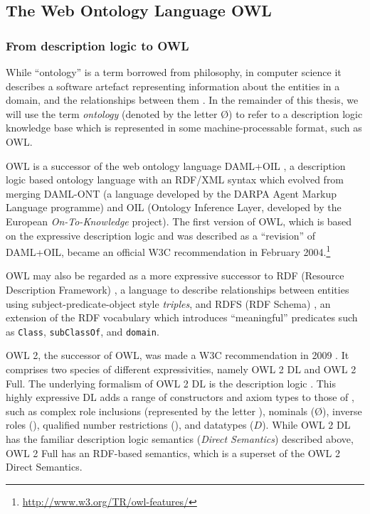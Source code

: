 \subsection{The Web Ontology Language OWL}


\subsubsection{From description logic to OWL}

While \enquote{ontology} is a term borrowed from philosophy, in computer science it describes a software artefact representing information about the entities in a domain, and the relationships between them \cite{gruber93xg}. In the remainder of this thesis, we will use the term \emph{ontology} (denoted by the letter \O) to refer to a description logic knowledge base which is represented in some machine-processable format, such as OWL. 

OWL is a successor of the web ontology language DAML+OIL \cite{horrocks02aa}, a description logic based ontology language with an RDF/XML syntax which evolved from merging DAML-ONT (a language developed by the DARPA Agent Markup Language programme) and OIL (Ontology Inference Layer, developed by the European \emph{On-To-Knowledge} project). The first version of OWL, which is based on the expressive description logic  and was described as a \enquote{revision} of DAML+OIL, became an official W3C recommendation in February 2004.\footnote{\url{http://www.w3.org/TR/owl-features/}} 

OWL may also be regarded as a more expressive successor to RDF (Resource Description Framework) \cite{w3c04aa}, a language to describe relationships between entities using subject-predicate-object style \emph{triples}, and RDFS (RDF Schema) \cite{w3c04ab}, an extension of the RDF vocabulary which introduces \enquote{meaningful} predicates such as \texttt{Class}, \texttt{subClassOf}, and \texttt{domain}.

OWL 2, the successor of OWL, was made a W3C recommendation in 2009 \cite{w3c09eu}. It comprises two species of different expressivities, namely OWL 2 DL and OWL 2 Full. The underlying formalism of OWL 2 DL is the description logic  \cite{horrocks06ya}. This highly expressive DL adds a range of constructors and axiom types to those of , such as complex role inclusions (represented by the letter \R), nominals (\O), inverse roles (\I), qualified number restrictions (\Q), and datatypes ($D$). While OWL 2 DL has the familiar description logic semantics (\emph{Direct Semantics}) described above, OWL 2 Full \cite{w3c12aa} has an RDF-based semantics, which is a superset of the OWL 2 Direct Semantics.

